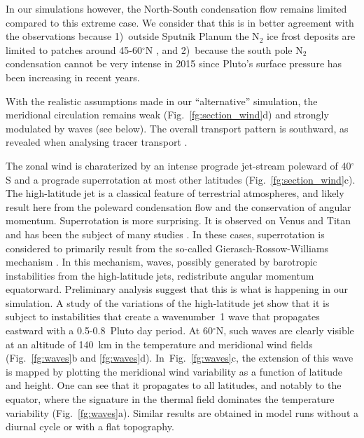 In our simulations however, the North-South condensation flow remains limited compared to
this extreme case. We consider that this is in better agreement with the observations 
because 1)~outside Sputnik Planum the N$_2$ ice frost deposits are limited to patches around
45-60$^{\circ}$N \citep{Grun:16}, and 2)~because the south pole 
N$_2$ condensation cannot be very intense in 2015 since Pluto's surface pressure has been
increasing in recent years. 

With the realistic assumptions made in our ``alternative'' simulation, the meridional
circulation remains weak (Fig.~\ref{fg:section_wind}d) 
and strongly modulated by waves (see below). The overall transport
pattern is southward, as revealed when analysing tracer transport \citep{Bert:16ica}. 

The zonal wind is charaterized by an intense prograde jet-stream poleward of 40$^\circ$S and
a prograde superrotation at most other latitudes (Fig.~\ref{fg:section_wind}c). 
The high-latitude jet is a 
classical feature of terrestrial atmospheres, and likely result here from the
poleward condensation flow and the conservation of angular momentum. Superrotation is
more surprising. It is observed on Venus and Titan and has been the subject of many studies
\citep[see, e.g. ][and references therein]{Lebo:10}. In these cases, superrotation is
considered to primarily result from the so-called Gierasch-Rossow-Williams mechanism
\citep[from][]{Gier:75,Ross:79}. In this mechanism, waves, possibly generated  
by barotropic instabilities from the high-latitude jets, redistribute angular momentum
equatorward. Preliminary analysis suggest that this is what is happening in our simulation. 
A study of the variations of the high-latitude jet show that it is subject to
instabilities that create a wavenumber~1 wave that propagates eastward with a 0.5-0.8~Pluto day
period. At 60$^{\circ}$N, such waves are clearly visible at an altitude of 140~km 
in the temperature and meridional wind fields (Fig.~\ref{fg:waves}b and
\ref{fg:waves}d). In~Fig.~\ref{fg:waves}c, the extension of this wave is
mapped by plotting the meridional wind variability as a function of latitude and
height. One can see that it propagates to all latitudes, and notably to the equator,
where the signature in the thermal field dominates the temperature variability 
(Fig.~\ref{fg:waves}a). Similar results are obtained in model runs 
without a diurnal cycle or with a flat topography.

